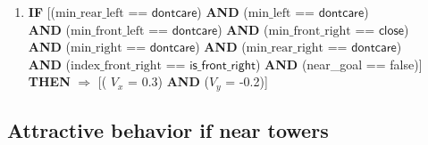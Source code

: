 \begin{enumerate}
	\item \textbf{IF} [($\text{min\_rear\_left}$ == $\textsf{dontcare}$) 
	\textbf{AND} ($\text{min\_left}$ == $\textsf{dontcare}$)\\
	\textbf{AND} ($\text{min\_front\_left}$ == $\textsf{dontcare}$)
	\textbf{AND} ($\text{min\_front\_right}$ == $\textsf{close}$)\\
	\textbf{AND} ($\text{min\_right}$ == $\textsf{dontcare}$) 
	\textbf{AND} ($\text{min\_rear\_right}$ == $\textsf{dontcare}$) \\
	\textbf{AND} ($\text{index\_front\_right}$ == $\textsf{is\_front\_right}$)
	\textbf{AND} (near\_goal == \textsf{false})]\\
	\textbf{THEN} $\Rightarrow$ [( $V_x$ = \textsf{0.3}) \textbf{AND} ($V_y$ = \textsf{-0.2})]
\end{enumerate}

\subsection{Attractive behavior if near towers}

